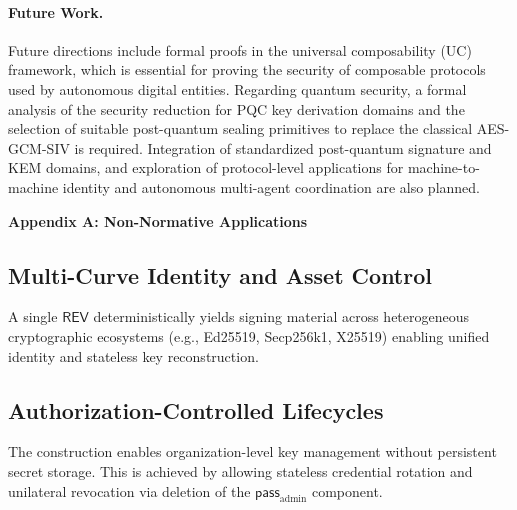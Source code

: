 \documentclass[12pt,a4paper]{article}
\begin{document}
  \paragraph{Future Work.}
  Future directions include formal proofs in the universal composability
  (UC) framework, which is essential for proving the security of composable protocols used by autonomous digital entities. Regarding quantum security, a formal analysis of the security reduction for PQC key derivation domains and the selection of suitable post-quantum sealing primitives to replace the classical AES-GCM-SIV is required. Integration of standardized post-quantum signature and KEM domains, and exploration of protocol-level applications for
  machine-to-machine identity and autonomous multi-agent coordination are also planned.

    \renewcommand{\refname}{Normative References}
    
    

\clearpage
{}
{}

\begin{center}
    {\large\bfseries Appendix A: Non-Normative Applications\par}
    \vspace{1.5em}
\end{center}

\setcounter{section}{0}
\renewcommand{\thesection}{A}
\renewcommand{\thesubsection}{A.\arabic{subsection}}
\setcounter{subsection}{0}

\subsection{Multi-Curve Identity and Asset Control}
A single $\mathsf{REV}$ deterministically yields signing material across heterogeneous cryptographic ecosystems (e.g., Ed25519, Secp256k1, X25519) enabling unified identity and stateless key reconstruction.

\subsection{Authorization-Controlled Lifecycles}
The construction enables organization-level key management without persistent secret storage. This is achieved by allowing stateless credential rotation and unilateral revocation via deletion of the $\mathsf{pass}_{\mathrm{admin}}$ component.
\end{document}
